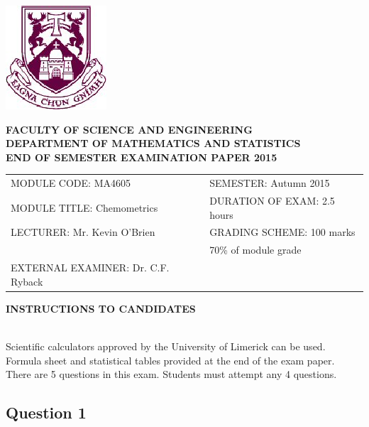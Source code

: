 \documentclass[a4paper,12pt]{article}
\begin{document}
\begin{center}
       \includegraphics[scale=0.55]{images/shieldtransparent2}
\end{center}

\begin{center}
\vspace{1cm}
\large \bf {FACULTY OF SCIENCE AND ENGINEERING} \\[0.5cm]
\normalsize DEPARTMENT OF MATHEMATICS AND STATISTICS \\[1.25cm]
\large \bf {END OF SEMESTER EXAMINATION PAPER 2015} \\[1.5cm]
\end{center}

\begin{tabular}{ll}
MODULE CODE: MA4605 & SEMESTER: Autumn 2015 \\[1cm]
MODULE TITLE: Chemometrics & DURATION OF EXAM: 2.5 hours  \\[1cm]
LECTURER: Mr. Kevin O'Brien & GRADING SCHEME: 100 marks \\
& \phantom{GRADING SCHEME:} \footnotesize {70\% of module grade} \\[1cm]
EXTERNAL EXAMINER: Dr. C.F. Ryback  &  \\[1cm]

\end{tabular}
\vspace{-0.5cm}
\begin{center}
{\bf INSTRUCTIONS TO CANDIDATES}
\end{center}

{\noindent \\ Scientific calculators approved by the University of Limerick can be used. \\
Formula sheet and statistical tables provided at the end of the exam paper.\\
There are 5 questions in this exam. Students must attempt any 4 questions.}
\newpage
\subsection*{Question 1}
\end{document}
